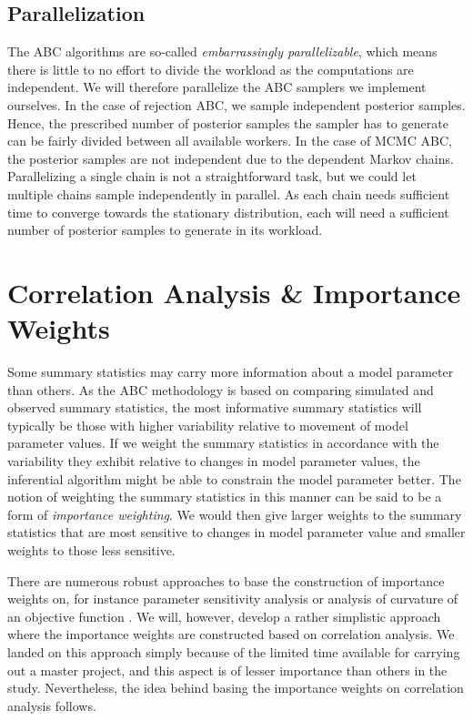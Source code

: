 \subsection{Parallelization}

The ABC algorithms are so-called \textit{embarrassingly parallelizable}, which means there is little to no effort to divide the workload as the computations are independent. We will therefore parallelize the ABC samplers we implement ourselves. In the case of rejection ABC, we sample independent posterior samples. Hence, the prescribed number of posterior samples the sampler has to generate can be fairly divided between all available workers. In the case of MCMC ABC, the posterior samples are not independent due to the dependent Markov chains. Parallelizing a single chain is not a straightforward task, but we could let multiple chains sample independently in parallel. As each chain needs sufficient time to converge towards the stationary distribution, each will need a sufficient number of posterior samples to generate in its workload. 

\section{Correlation Analysis \& Importance Weights}

Some summary statistics may carry more information about a model parameter than others. As the ABC methodology is based on comparing simulated and observed summary statistics, the most informative summary statistics will typically be those with higher variability relative to movement of model parameter values. If we weight the summary statistics in accordance with the variability they exhibit relative to changes in model parameter values, the inferential algorithm might be able to constrain the model parameter better. The notion of weighting the summary statistics in this manner can be said to be a form of \textit{importance weighting}. We would then give larger weights to the summary statistics that are most sensitive to changes in model parameter value and smaller weights to those less sensitive. 

There are numerous robust approaches to base the construction of importance weights on, for instance parameter sensitivity analysis \cite{uncertainpy} or analysis of curvature of an objective function \cite{druckmann}. We will, however, develop a rather simplistic approach where the importance weights are constructed based on correlation analysis. We landed on this approach simply because of the limited time available for carrying out a master project, and this aspect is of lesser importance than others in the study. Nevertheless, the idea behind basing the importance weights on correlation analysis follows. 

